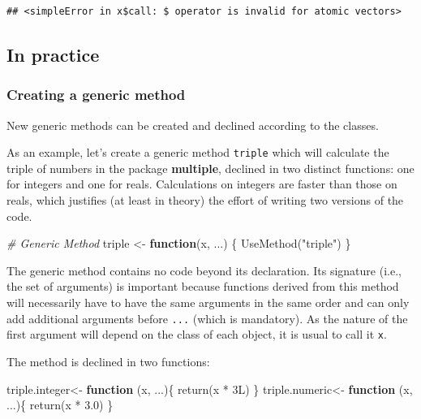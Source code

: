 \documentclass[
  12pt,
  american,
  a4paper,
  extrafontsizes,onecolumn,openright
  ]{memoir}
\newenvironment{Shaded}{\begin{snugshade}}{\end{snugshade}}
\newcommand{\CommentTok}[1]{\textcolor[rgb]{0.56,0.35,0.01}{\textit{#1}}}
\newcommand{\ControlFlowTok}[1]{\textcolor[rgb]{0.13,0.29,0.53}{\textbf{#1}}}
\newcommand{\FloatTok}[1]{\textcolor[rgb]{0.00,0.00,0.81}{#1}}
\newcommand{\FunctionTok}[1]{\textcolor[rgb]{0.00,0.00,0.00}{#1}}
\newcommand{\NormalTok}[1]{#1}
\newcommand{\OtherTok}[1]{\textcolor[rgb]{0.56,0.35,0.01}{#1}}
\newcommand{\SpecialCharTok}[1]{\textcolor[rgb]{0.00,0.00,0.00}{#1}}
\newcommand{\StringTok}[1]{\textcolor[rgb]{0.31,0.60,0.02}{#1}}
\begin{document}
\begin{verbatim}
## <simpleError in x$call: $ operator is invalid for atomic vectors>
\end{verbatim}

\normalsize

\hypertarget{in-practice}{%
\subsection{In practice}\label{in-practice}}

\hypertarget{creating-a-generic-method}{%
\subsubsection{Creating a generic method}\label{creating-a-generic-method}}

New generic methods can be created and declined according to the classes.

As an example, let's create a generic method \texttt{triple} which will calculate the triple of numbers in the package \textbf{multiple}, declined in two distinct functions: one for integers and one for reals.
Calculations on integers are faster than those on reals, which justifies (at least in theory) the effort of writing two versions of the code.

\scriptsize

\begin{Shaded}
\begin{Highlighting}[]
\CommentTok{\# Generic Method}
\NormalTok{triple }\OtherTok{\textless{}{-}} \ControlFlowTok{function}\NormalTok{(x, ...) \{}
    \FunctionTok{UseMethod}\NormalTok{(}\StringTok{"triple"}\NormalTok{)}
\NormalTok{\}}
\end{Highlighting}
\end{Shaded}

\normalsize

The generic method contains no code beyond its declaration.
Its signature (i.e., the set of arguments) is important because functions derived from this method will necessarily have to have the same arguments in the same order and can only add additional arguments before \texttt{...} (which is mandatory).
As the nature of the first argument will depend on the class of each object, it is usual to call it \texttt{x}.

The method is declined in two functions:

\scriptsize

\begin{Shaded}
\begin{Highlighting}[]
\NormalTok{triple.integer}\OtherTok{\textless{}{-}} \ControlFlowTok{function}\NormalTok{ (x, ...)\{}
  \FunctionTok{return}\NormalTok{(x }\SpecialCharTok{*}\NormalTok{ 3L)}
\NormalTok{\}}
\NormalTok{triple.numeric}\OtherTok{\textless{}{-}} \ControlFlowTok{function}\NormalTok{ (x, ...)\{}
  \FunctionTok{return}\NormalTok{(x }\SpecialCharTok{*} \FloatTok{3.0}\NormalTok{)}
\NormalTok{\}}
\end{Highlighting}
\end{Shaded}
\end{document}
